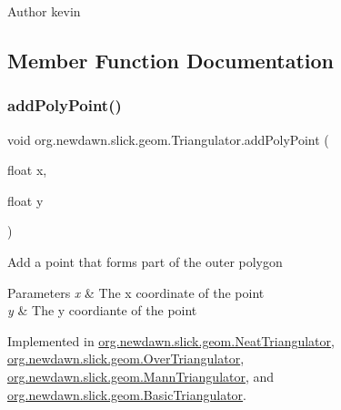 \begin{DoxyAuthor}{Author}
kevin 
\end{DoxyAuthor}


\subsection{Member Function Documentation}
\mbox{\label{interfaceorg_1_1newdawn_1_1slick_1_1geom_1_1_triangulator_a32b11eccb582c7f4993a944df0b1db65}} 
\subsubsection{\texorpdfstring{add\+Poly\+Point()}{addPolyPoint()}}
{\footnotesize\ttfamily void org.\+newdawn.\+slick.\+geom.\+Triangulator.\+add\+Poly\+Point (\begin{DoxyParamCaption}\item[{float}]{x,  }\item[{float}]{y }\end{DoxyParamCaption})}

Add a point that forms part of the outer polygon


\begin{DoxyParams}{Parameters}
{\em x} & The x coordinate of the point \\
\hline
{\em y} & The y coordiante of the point \\
\hline
\end{DoxyParams}


Implemented in \mbox{\hyperlink{classorg_1_1newdawn_1_1slick_1_1geom_1_1_neat_triangulator_a6203fd3d4b9892789ebd3512d6cb403f}{org.\+newdawn.\+slick.\+geom.\+Neat\+Triangulator}}, \mbox{\hyperlink{classorg_1_1newdawn_1_1slick_1_1geom_1_1_over_triangulator_a6a17184e4004dd942f52d5b150369e86}{org.\+newdawn.\+slick.\+geom.\+Over\+Triangulator}}, \mbox{\hyperlink{classorg_1_1newdawn_1_1slick_1_1geom_1_1_mann_triangulator_a411808c4fa26392c69dc6c6d370f8b9e}{org.\+newdawn.\+slick.\+geom.\+Mann\+Triangulator}}, and \mbox{\hyperlink{classorg_1_1newdawn_1_1slick_1_1geom_1_1_basic_triangulator_a72549d87e657743bc012c0a34784751c}{org.\+newdawn.\+slick.\+geom.\+Basic\+Triangulator}}.

